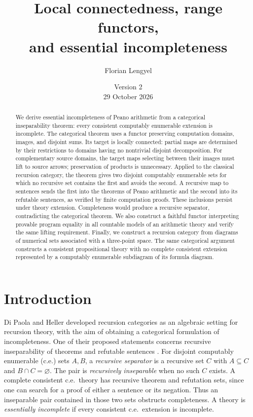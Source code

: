 \documentclass[11pt]{article}
\title{Local connectedness, range functors,\\
and essential incompleteness}
\author{Florian Lengyel}
\date{Version 2\\29 October 2026}
\begin{document}
\maketitle

\begin{abstract}
We derive essential incompleteness of Peano arithmetic from a categorical
inseparability theorem: every consistent computably enumerable extension
is incomplete. The categorical theorem uses a functor preserving
computation domains, images, and disjoint sums. Its target is locally
connected: partial maps are determined by their restrictions to domains
having no nontrivial disjoint decomposition. For complementary source
domains, the target maps selecting between their images must lift to
source arrows; preservation of products is unnecessary.
Applied to the classical recursion category, the theorem gives two
disjoint computably enumerable sets for which no recursive set contains
the first and avoids the second. A recursive map to sentences sends
the first into the theorems of Peano arithmetic and the second into
its refutable sentences, as verified by finite computation proofs.
These inclusions persist under theory extension. Completeness would
produce a recursive separator, contradicting the categorical theorem.
We also construct a faithful functor interpreting provable program
equality in all countable models of an arithmetic theory and verify
the same lifting requirement.
Finally, we construct a recursion category from diagrams of numerical
sets associated with a three-point space. The same categorical argument
constructs a consistent propositional theory with no complete consistent
extension represented by a computably enumerable subdiagram of its
formula diagram.
\end{abstract}

\section{Introduction}

Di Paola and Heller developed recursion categories as an algebraic
setting for recursion theory, with the aim of obtaining a categorical
formulation of incompleteness. One of their proposed statements
concerns recursive inseparability of theorems and refutable sentences
\cite[pp.~594--595]{DPH}.
For disjoint computably enumerable (c.e.) sets $A,B$, a \emph{recursive
separator} is a recursive set $C$ with $A\subseteq C$ and
$B\cap C=\varnothing$. The pair is \emph{recursively inseparable}
when no such $C$ exists. A complete consistent c.e.\ theory has
recursive theorem and refutation sets, since one can search for a
proof of either a sentence or its negation. Thus an inseparable pair
contained in those two sets obstructs completeness. A theory is
\emph{essentially incomplete} if every consistent c.e.\ extension
is incomplete.
\end{document}
